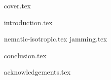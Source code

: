 \documentclass[10pt]{article}
\begin{document}
{cover.tex}

\tableofcontents
\thispagestyle{empty}
\newpage
\setcounter{page}{1}

{introduction.tex}

{nematic-isotropic.tex}
{jamming.tex}

{conclusion.tex}
 
{acknowledgements.tex}

\newpage
{}

{\renewcommand{\bibname}{References}}
\end{document}
